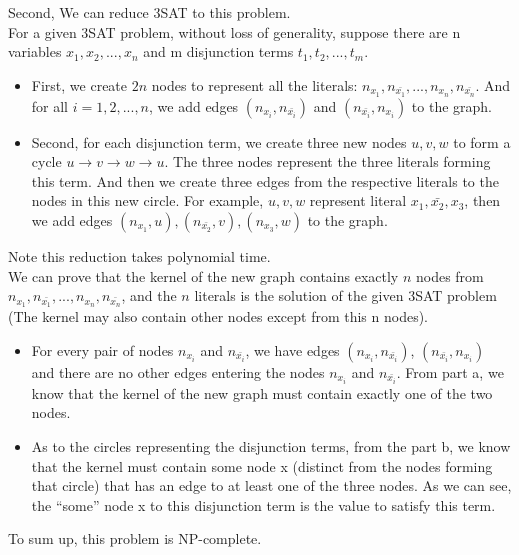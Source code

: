 \documentclass[12pt]{article}
\begin{document}
Second, We can reduce 3SAT to this problem. \\

For a given 3SAT problem, without loss of generality, suppose there
are n variables $x_1, x_2, ..., x_n$ and m disjunction terms $t_1,
t_2, ..., t_m$. 

\begin{itemize}
\item First, we create $2n$ nodes to represent all the literals:
  $n_{x_1}, n_{\bar {x_1}}, ..., n_{x_n}, n_{\bar {x_n}}$. And for all
  $i = 1, 2, ..., n$, we add edges $(n_{x_i}, n_{\bar{x_i}})$ and
  $(n_{\bar{x_i}}, n_{x_i})$ to the graph. 
\item Second, for each disjunction term, we create three new nodes $u,
  v, w$ to form a cycle $u \to v \to w \to u$. The three nodes represent
  the three literals forming this term. And then we create three edges
  from the respective literals to the nodes in this new circle. For
  example, $u, v, w$ represent literal $x_1, \bar {x_2}, x_3$, then
  we add edges $(n_{x_1}, u), (n_{\bar {x_2}}, v), (n_{x_3}, w)$ to
  the graph.
\end{itemize}

Note this reduction takes polynomial time. \\

We can prove that the kernel of the new graph contains exactly $n$
nodes from $n_{x_1}, n_{\bar {x_1}}, ..., n_{x_n}, n_{\bar {x_n}}$,
and the $n$ literals is the solution of the given 3SAT problem (The
kernel may also contain other nodes except from this n nodes).

\begin{itemize}
\item For every pair of nodes $n_{x_i}$ and $n_{\bar {x_i}}$, we have
  edges $(n_{x_i}, n_{\bar{x_i}})$, $(n_{\bar{x_i}}, n_{x_i})$ and
  there are no other edges entering the nodes $n_{x_i}$ and $n_{\bar
    {x_i}}$. From part a, we know that the kernel of the new graph
  must contain exactly one of the two nodes.
\item As to the circles representing the disjunction terms, from the
  part b, we know that the kernel must contain some node x (distinct
  from the nodes forming that circle) that has an edge to at least one
  of the three nodes. As we can see, the ``some'' node x to this
  disjunction term is the value to satisfy this term.
\end{itemize}

To sum up, this problem is NP-complete.
\end{document}
